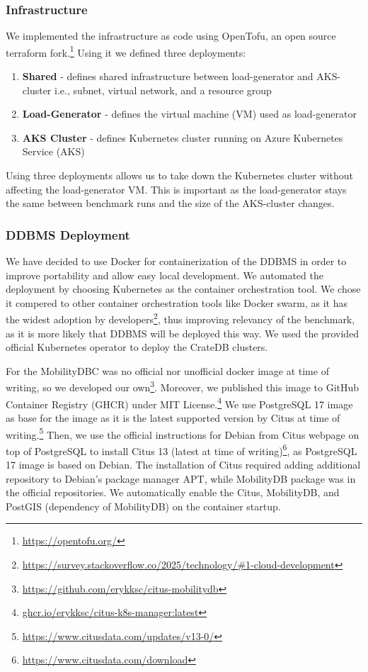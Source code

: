 \subsubsection{Infrastructure}
We implemented the infrastructure as code using OpenTofu, an open source terraform fork.\footnote{\url{https://opentofu.org/}}
Using it we defined three deployments:
\begin{enumerate}
  \item \textbf{Shared} - defines shared infrastructure between load-generator and AKS-cluster i.e., subnet, virtual network, and a resource group
  \item \textbf{Load-Generator} - defines the virtual machine (VM) used as load-generator
  \item \textbf{AKS Cluster} - defines Kubernetes cluster running on Azure Kubernetes Service (AKS)
\end{enumerate}

Using three deployments allows us to take down the Kubernetes cluster without affecting the load-generator VM.
This is important as the load-generator stays the same between benchmark runs and the size of the AKS-cluster changes.

\subsubsection{DDBMS Deployment}

We have decided to use Docker for containerization of the DDBMS in order to improve portability and allow easy local development.
We automated the deployment by choosing Kubernetes as the container orchestration tool.
We chose it compered to other container orchestration tools like Docker swarm, as it has the widest adoption by developers\footnote{\url{https://survey.stackoverflow.co/2025/technology/\#1-cloud-development}}, thus improving relevancy of the benchmark, as it is more likely that DDBMS will be deployed this way. We used the provided official Kubernetes operator to deploy the CrateDB clusters.

For the MobilityDBC was no official nor unofficial docker image at time of writing, so we developed our own\footnote{\url{https://github.com/erykksc/citus-mobilitydb}}.
Moreover, we published this image to GitHub Container Registry (GHCR) under MIT License.\footnote{\url{ghcr.io/erykksc/citus-k8s-manager:latest}}
We use PostgreSQL 17 image as base for the image as it is the latest supported version by Citus at time of writing.\footnote{\url{https://www.citusdata.com/updates/v13-0/}}
Then, we use the official instructions for Debian from Citus webpage on top of PostgreSQL to install Citus 13 (latest at time of writing)\footnote{\url{https://www.citusdata.com/download}}, as PostgreSQL 17 image is based on Debian.
The installation of Citus required adding additional repository to Debian's package manager APT, while MobilityDB package was in the official repositories.
We automatically enable the Citus, MobilityDB, and PostGIS (dependency of MobilityDB) on the container startup.

